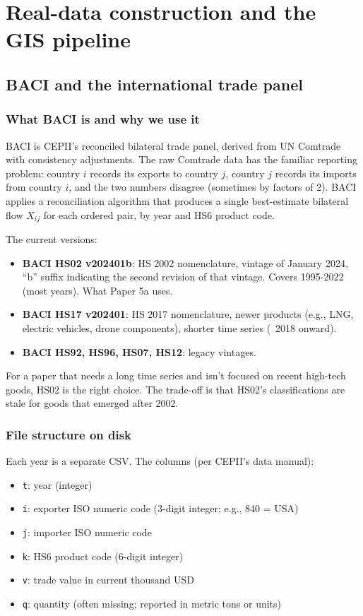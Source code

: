 \documentclass[11pt,letterpaper,oneside]{book}
\theoremstyle{definition}
\theoremstyle{remark}
\begin{document}
\part{Real-data construction and the GIS pipeline}

\chapter{BACI and the international trade panel}
\label{ch:baci}

\section{What BACI is and why we use it}

BACI is CEPII's reconciled bilateral trade panel, derived from UN
Comtrade with consistency adjustments. The raw Comtrade data has the
familiar reporting problem: country $i$ records its exports to country
$j$, country $j$ records its imports from country $i$, and the two
numbers disagree (sometimes by factors of 2). BACI applies a
reconciliation algorithm that produces a single best-estimate bilateral
flow $X_{ij}$ for each ordered pair, by year and HS6 product code.

The current versions:
\begin{itemize}
  \item \textbf{BACI HS02 v202401b}: HS 2002 nomenclature, vintage of January
    2024, ``b'' suffix indicating the second revision of that vintage.
    Covers 1995-2022 (most years). What Paper 5a uses.
  \item \textbf{BACI HS17 v202401}: HS 2017 nomenclature, newer products
    (e.g., LNG, electric vehicles, drone components), shorter time series
    (~2018 onward).
  \item \textbf{BACI HS92, HS96, HS07, HS12}: legacy vintages.
\end{itemize}

For a paper that needs a long time series and isn't focused on recent
high-tech goods, HS02 is the right choice. The trade-off is that
HS02's classifications are stale for goods that emerged after 2002.

\section{File structure on disk}

Each year is a separate CSV. The columns (per CEPII's data manual):
\begin{itemize}
  \item \texttt{t}: year (integer)
  \item \texttt{i}: exporter ISO numeric code (3-digit integer; e.g., 840 = USA)
  \item \texttt{j}: importer ISO numeric code
  \item \texttt{k}: HS6 product code (6-digit integer)
  \item \texttt{v}: trade value in current thousand USD
  \item \texttt{q}: quantity (often missing; reported in metric tons or units)
\end{itemize}
\end{document}
